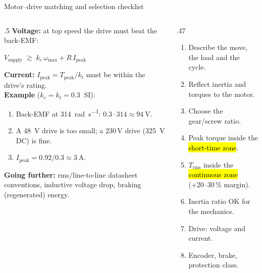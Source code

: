 \documentclass[aspectratio=169,10pt]{beamer}
\newcommand{\gofurther}[1]{{\scriptsize\color{mkGray}\textbf{Going further:} #1\par}}
\begin{document}
\begin{frame}{Motor--drive matching and selection checklist}
\begin{columns}[T]
\begin{column}{.5\textwidth}
\small
\textbf{Voltage:} at top speed the drive must beat the back-EMF:
\begin{eqbox}
$V_\text{supply}\;\gtrsim\;k_e\,\omega_\text{max}+R\,I_\text{peak}$
\end{eqbox}
\textbf{Current:} $I_\text{peak}=T_\text{peak}/k_t$ must be within the drive's rating.\\[1mm]
\textbf{Example} ($k_e=k_t=\SI{0.3}{}$ SI):
\begin{enumerate}\setlength\itemsep{1pt}
\item Back-EMF at \SI{314}{\radian\per\second}: $0.3\cdot314\approx\SI{94}{\volt}$.
\item A \SI{48}{\volt} drive is too small; a 230\,V drive (\SI{325}{\volt} DC) is fine.
\item $I_\text{peak}=0.92/0.3\approx\SI{3}{\ampere}$.
\end{enumerate}
\gofurther{rms/line-to-line datasheet conventions, inductive voltage drop, braking (regenerated) energy.}
\end{column}
\begin{column}{.47\textwidth}
\begin{keybox}
\small
\begin{enumerate}\setlength\itemsep{0pt}
\item Describe the move, the load and the cycle.
\item Reflect inertia and torques to the motor.
\item Choose the gear/screw ratio.
\item Peak torque inside the \hl{short-time zone}.
\item $T_\text{rms}$ inside the \hl{continuous zone} (+20--30\,\% margin).
\item Inertia ratio OK for the mechanics.
\item Drive: voltage and current.
\item Encoder, brake, protection class.
\end{enumerate}
\end{keybox}
\end{column}
\end{columns}
\end{frame}
\end{document}

